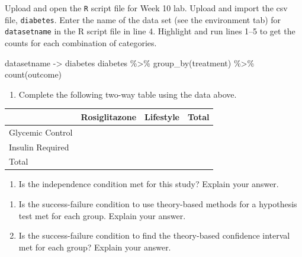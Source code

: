 \documentclass[
]{report}
\newenvironment{Shaded}{\begin{snugshade}}{\end{snugshade}}
\newcommand{\FunctionTok}[1]{\textcolor[rgb]{0.00,0.00,0.00}{#1}}
\newcommand{\NormalTok}[1]{#1}
\newcommand{\OtherTok}[1]{\textcolor[rgb]{0.56,0.35,0.01}{#1}}
\newcommand{\SpecialCharTok}[1]{\textcolor[rgb]{0.00,0.00,0.00}{#1}}
\providecommand{\tightlist}{%
  \setlength{\itemsep}{0pt}\setlength{\parskip}{0pt}}
\begin{document}
Upload and open the \texttt{R} script file for Week 10 lab. Upload and import the csv file, \texttt{diabetes}. Enter the name of the data set (see the environment tab) for \texttt{datasetname} in the R script file in line 4. Highlight and run lines 1--5 to get the counts for each combination of categories.

\begin{Shaded}
\begin{Highlighting}[]
\NormalTok{datasetname }\OtherTok{{-}\textgreater{}}\NormalTok{ diabetes}
\NormalTok{diabetes }\SpecialCharTok{\%\textgreater{}\%} \FunctionTok{group\_by}\NormalTok{(treatment) }\SpecialCharTok{\%\textgreater{}\%} \FunctionTok{count}\NormalTok{(outcome)}
\end{Highlighting}
\end{Shaded}

\begin{enumerate}
\def\labelenumi{\arabic{enumi}.}
\tightlist
\item
  Complete the following two-way table using the data above.
\end{enumerate}

\begin{longtable}[]{@{}llll@{}}
\toprule
& Rosiglitazone & Lifestyle & Total \\
\midrule
\endhead
Glycemic Control & & & \\
Insulin Required & & & \\
Total & & & \\
\bottomrule
\end{longtable}

\begin{enumerate}
\def\labelenumi{\arabic{enumi}.}
\setcounter{enumi}{1}
\tightlist
\item
  Is the independence condition met for this study? Explain your answer.
\end{enumerate}

\vspace{0.8in}

\begin{enumerate}
\def\labelenumi{\arabic{enumi}.}
\setcounter{enumi}{2}
\item
  Is the success-failure condition to use theory-based methods for a hypothesis test met for each group. Explain your answer.
  \vspace{1in}
\item
  Is the success-failure condition to find the theory-based confidence interval met for each group? Explain your answer.
\end{enumerate}
\end{document}
